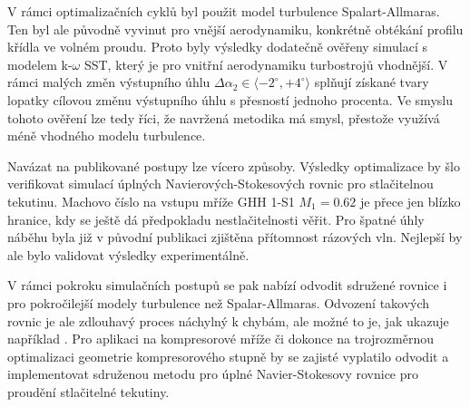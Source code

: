 V rámci optimalizačních cyklů byl použit model turbulence Spalart-Allmaras. Ten byl ale původně vyvinut pro vnější aerodynamiku, konkrétně obtékání profilu křídla ve volném proudu. Proto byly výsledky dodatečně ověřeny simulací s modelem k-$ \omega $ SST, který je pro vnitřní aerodynamiku turbostrojů vhodnější. V rámci malých změn výstupního úhlu $ \Delta\alpha_2 \in \langle -2^\circ,+4^\circ \rangle $ splňují získané tvary lopatky cílovou změnu výstupního úhlu s přesností jednoho procenta. Ve smyslu tohoto ověření lze tedy říci, že navržená metodika má smysl, přestože využívá méně vhodného modelu turbulence.

Navázat na publikované postupy lze vícero způsoby. Výsledky optimalizace by šlo verifikovat simulací úplných Navierových-Stokesových rovnic pro stlačitelnou tekutinu. Machovo číslo na vstupu mříže GHH 1-S1 $ M_1=0.62 $ je přece jen blízko hranice, kdy se ještě dá předpokladu nestlačitelnosti věřit. Pro špatné úhly náběhu byla již v původní publikaci \cite{steinert1990design} zjištěna přítomnost rázových vln. Nejlepší by ale bylo validovat výsledky experimentálně.

V rámci pokroku simulačních postupů se pak nabízí odvodit sdružené rovnice i pro pokročilejší modely turbulence než Spalar-Allmaras. Odvození takových rovnic je ale zdlouhavý proces náchylný k chybám, ale možné to je, jak ukazuje například \cite{kavvadias2015continuous}. Pro aplikaci na kompresorové mříže či dokonce na trojrozměrnou optimalizaci geometrie kompresorového stupně by se zajisté vyplatilo odvodit a implementovat sdruženou metodu pro úplné Navier-Stokesovy rovnice pro proudění stlačitelné tekutiny. 







